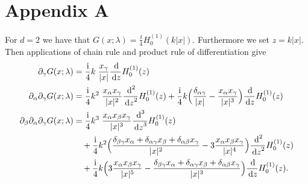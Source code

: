\chapter*{Appendix A}

For $d = 2$ we have that $G(x; \lambda) = \frac{\ii}{4} H_0^{(1)}(k|x|)$.
Furthermore we set $z =  k|x|$.  
Then applications of chain rule and product rule of differentiation give
\begin{align*}
  \partial_\gamma G(x; \lambda) &= \frac{\ii}{4} k\;  \frac{x_\gamma}{|x|} \frac{\d{}}{\d z} H_0^{(1)}(z) \\
  \partial_\alpha \partial_\gamma G(x; \lambda) 
  &= \frac{\ii}{4} k^2 \;  \frac{x_\alpha x_\gamma}{|x|^2} \frac{\d{}^2}{\d z^2} H_0^{(1)}(z) + \frac{\ii}{4} k \Big(\frac{\delta_{\alpha\gamma}}{|x|} - \frac{x_\alpha x_\gamma}{|x|^3} \Big) \frac{\d{}}{\d z} H_0^{(1)}(z) \\
  \partial_\beta \partial_\alpha \partial_\gamma G(x; \lambda)
  &= \frac{\ii}{4} k^3 \; \frac{x_\alpha x_\beta x_\gamma}{|x|^3} \frac{\d{}^3}{\d z^3} H_0^{(1)}(z) \\
  &\quad + \frac{\ii}{4} k^2 \Big(\frac{\delta_{\beta\gamma} x_\alpha + \delta_{\alpha \gamma} x_\beta + \delta_{\alpha \beta} x_\gamma}{|x|^2} - 3 \frac{x_\alpha x_\beta x_\gamma}{|x|^4} \Big) \frac{\d{}^2}{\d z^2} H_0^{(1)}(z) \\
  &\quad + \frac{\ii}{4} k \Big( 3 \frac{x_\alpha x_\beta x_\gamma}{|x|^5} - \frac{\delta_{\beta\gamma} x_\alpha + \delta_{\alpha\gamma} x_\beta + \delta_{\alpha\beta} x_\gamma}{|x|^3} \Big) \frac{\d{}}{\d z} H_0^{(1)}(z).
\end{align*}

